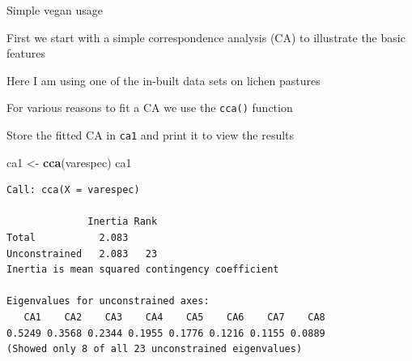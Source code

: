\documentclass[10pt,ignorenonframetext,compress, aspectratio=169]{beamer}
\newenvironment{Shaded}{\begin{snugshade}}{\end{snugshade}}
\newcommand{\KeywordTok}[1]{\textcolor[rgb]{0.13,0.29,0.53}{\textbf{{#1}}}}
\newcommand{\StringTok}[1]{\textcolor[rgb]{0.31,0.60,0.02}{{#1}}}
\newcommand{\NormalTok}[1]{{#1}}
\begin{document}
\begin{frame}[fragile]{Simple vegan usage}

First we start with a simple correspondence analysis (CA) to illustrate
the basic features

Here I am using one of the in-built data sets on lichen pastures

For various reasons to fit a CA we use the \texttt{cca()} function

Store the fitted CA in \texttt{ca1} and print it to view the results

\begin{Shaded}
\begin{Highlighting}[]
\NormalTok{ca1 <-}\StringTok{ }\KeywordTok{cca}\NormalTok{(varespec)}
\NormalTok{ca1}
\end{Highlighting}
\end{Shaded}

\begin{verbatim}
Call: cca(X = varespec)

              Inertia Rank
Total           2.083     
Unconstrained   2.083   23
Inertia is mean squared contingency coefficient 

Eigenvalues for unconstrained axes:
   CA1    CA2    CA3    CA4    CA5    CA6    CA7    CA8 
0.5249 0.3568 0.2344 0.1955 0.1776 0.1216 0.1155 0.0889 
(Showed only 8 of all 23 unconstrained eigenvalues)
\end{verbatim}

\end{frame}
\end{document}
